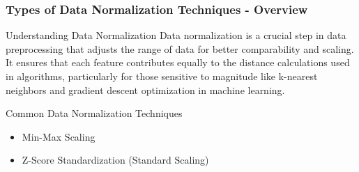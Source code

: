 \documentclass[aspectratio=169]{beamer}
\begin{document}
\begin{frame}[fragile]
    \frametitle{Types of Data Normalization Techniques - Overview}
    \begin{block}{Understanding Data Normalization}
        Data normalization is a crucial step in data preprocessing that adjusts the range of data for better comparability and scaling. It ensures that each feature contributes equally to the distance calculations used in algorithms, particularly for those sensitive to magnitude like k-nearest neighbors and gradient descent optimization in machine learning.
    \end{block}
    
    \begin{block}{Common Data Normalization Techniques}
        \begin{itemize}
            \item Min-Max Scaling
            \item Z-Score Standardization (Standard Scaling)
        \end{itemize}
    \end{block}
\end{frame}
\end{document}
